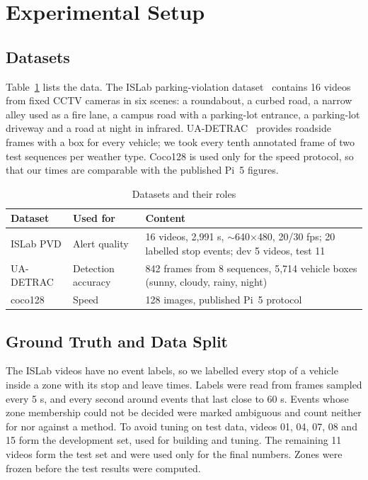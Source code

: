 \documentclass[conference]{IEEEtran}
\begin{document}
\section{Experimental Setup}
\subsection{Datasets}
Table~\ref{tab:data} lists the data. The ISLab parking-violation dataset~\cite{islabpvd} contains 16 videos from fixed CCTV cameras in six scenes: a roundabout, a curbed road, a narrow alley used as a fire lane, a campus road with a parking-lot entrance, a parking-lot driveway and a road at night in infrared. UA-DETRAC~\cite{wen2020detrac} provides roadside frames with a box for every vehicle; we took every tenth annotated frame of two test sequences per weather type. Coco128 is used only for the speed protocol, so that our times are comparable with the published Pi~5 figures.

\begin{table}[!t]
\caption{Datasets and their roles}
\label{tab:data}
\centering
\footnotesize
\begin{tabularx}{\columnwidth}{@{}p{1.5cm}p{1.5cm}X@{}}
\toprule
Dataset & Used for & Content \\
\midrule
ISLab PVD \cite{islabpvd} & Alert quality & 16 videos, 2,991 s, $\sim$640$\times$480, 20/30 fps; 20 labelled stop events; dev 5 videos, test 11 \\
UA-DETRAC \cite{wen2020detrac} & Detection accuracy & 842 frames from 8 sequences, 5,714 vehicle boxes (sunny, cloudy, rainy, night) \\
coco128 \cite{lin2014coco} & Speed & 128 images, published Pi~5 protocol \\
\bottomrule
\end{tabularx}
\end{table}

\subsection{Ground Truth and Data Split}
The ISLab videos have no event labels, so we labelled every stop of a vehicle inside a zone with its stop and leave times. Labels were read from frames sampled every 5 s, and every second around events that last close to 60 s. Events whose zone membership could not be decided were marked ambiguous and count neither for nor against a method. To avoid tuning on test data, videos 01, 04, 07, 08 and 15 form the development set, used for building and tuning. The remaining 11 videos form the test set and were used only for the final numbers. Zones were frozen before the test results were computed.
\end{document}
